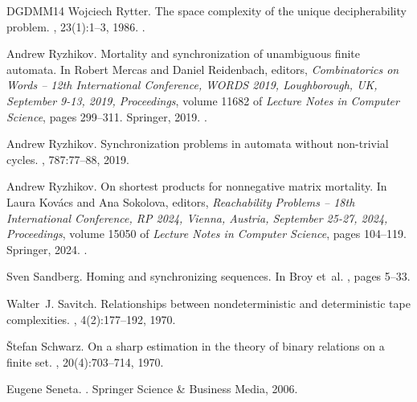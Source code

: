 \documentclass[11pt,a4paper]{amsart}
\theoremstyle{plain}
\theoremstyle{definition}
\theoremstyle{defC}
\theoremstyle{thmC}
\theoremstyle{plain}
\numberwithin{equation}{section}
\begin{document}
\begin{thebibliography}{DGDMM14}
Wojciech Rytter.
\newblock The space complexity of the unique decipherability problem.
, 23(1):1--3, 1986.
\newblock \href {https://doi.org/10.1016/0020-0190(86)90121-3}
  {}.

Andrew Ryzhikov.
\newblock Mortality and synchronization of unambiguous finite automata.
\newblock In Robert Mercas and Daniel Reidenbach, editors, {\em Combinatorics
  on Words -- 12th International Conference, {WORDS} 2019, Loughborough, UK,
  September 9-13, 2019, Proceedings}, volume 11682 of {\em Lecture Notes in
  Computer Science}, pages 299--311. Springer, 2019.
\newblock \href {https://doi.org/10.1007/978-3-030-28796-2\_24}
  {}.

Andrew Ryzhikov.
\newblock Synchronization problems in automata without non-trivial cycles.
, 787:77--88, 2019.

Andrew Ryzhikov.
\newblock On shortest products for nonnegative matrix mortality.
\newblock In Laura Kov{\'{a}}cs and Ana Sokolova, editors, {\em Reachability
  Problems -- 18th International Conference, {RP} 2024, Vienna, Austria,
  September 25-27, 2024, Proceedings}, volume 15050 of {\em Lecture Notes in
  Computer Science}, pages 104--119. Springer, 2024.
\newblock \href {https://doi.org/10.1007/978-3-031-72621-7\_8}
  {}.

Sven Sandberg.
\newblock Homing and synchronizing sequences.
\newblock In Broy et~al. \cite{DBLP:conf/dagstuhl/2004test}, pages 5--33.

Walter~J. Savitch.
\newblock Relationships between nondeterministic and deterministic tape
  complexities.
, 4(2):177--192, 1970.

{\v{S}}tefan Schwarz.
\newblock On a sharp estimation in the theory of binary relations on a finite
  set.
, 20(4):703--714, 1970.

Eugene Seneta.
.
\newblock Springer Science \& Business Media, 2006.


\end{thebibliography}
\end{document}
